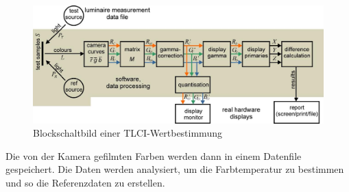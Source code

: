 \begin{figure}[htp]     %
\centering
\includegraphics[width=1.0\textwidth]{bilder/tlci1} 
\caption {Blockschaltbild einer TLCI-Wertbestimmung \protect\footnotemark}\label{b_tlci1}
\end{figure}
Die von der Kamera gefilmten Farben werden dann in einem Datenfile gespeichert. Die Daten werden analysiert, um die Farbtemperatur zu bestimmen und so die Referenzdaten zu erstellen.

